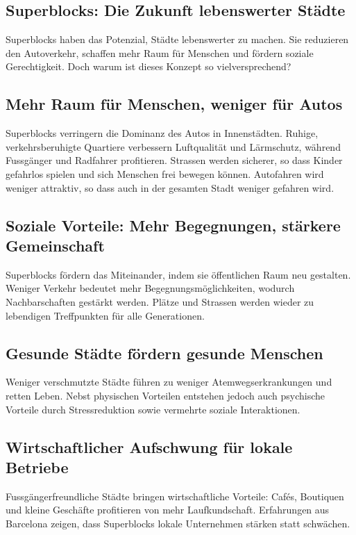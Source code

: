 \begin{tcolorbox}[title=Pro-Argumente,
			parbox=false,
			colback=ForestGreen!10,
			colframe=ForestGreen,
			colbacktitle=ForestGreen]
\section*{Superblocks: Die Zukunft lebenswerter Städte}

Superblocks haben das Potenzial, Städte lebenswerter zu machen. Sie reduzieren den Autoverkehr, schaffen mehr Raum für Menschen und fördern soziale Gerechtigkeit. Doch warum ist dieses Konzept so vielversprechend?

\subsection*{Mehr Raum für Menschen, weniger für Autos}
Superblocks verringern die Dominanz des Autos in Innenstädten. Ruhige, verkehrsberuhigte Quartiere verbessern Luftqualität und Lärmschutz, während Fussgänger und Radfahrer profitieren. Strassen werden sicherer, so dass Kinder gefahrlos spielen und sich Menschen frei bewegen können. Autofahren wird weniger attraktiv, so dass auch in der gesamten Stadt weniger gefahren wird.


\subsection*{Soziale Vorteile: Mehr Begegnungen, stärkere Gemeinschaft}
Superblocks fördern das Miteinander, indem sie öffentlichen Raum neu gestalten. Weniger Verkehr bedeutet mehr Begegnungsmöglichkeiten, wodurch Nachbarschaften gestärkt werden. Plätze und Strassen werden wieder zu lebendigen Treffpunkten für alle Generationen.

\subsection*{Gesunde Städte fördern gesunde Menschen}
Weniger verschmutzte Städte führen zu weniger Atemwegserkrankungen und retten Leben. Nebst physischen Vorteilen entstehen jedoch auch psychische Vorteile durch Stressreduktion sowie vermehrte soziale Interaktionen. 

\subsection*{Wirtschaftlicher Aufschwung für lokale Betriebe}
Fussgängerfreundliche Städte bringen wirtschaftliche Vorteile: Cafés, Boutiquen und kleine Geschäfte profitieren von mehr Laufkundschaft. Erfahrungen aus Barcelona zeigen, dass Superblocks lokale Unternehmen stärken statt schwächen.


\end{tcolorbox}
